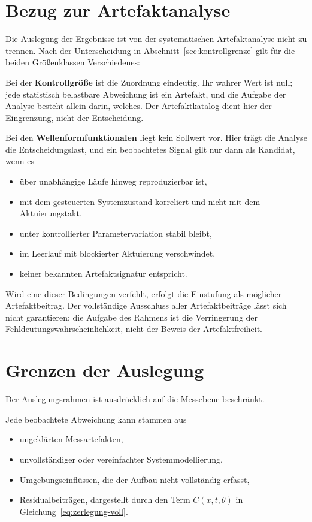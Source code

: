 \documentclass[12pt,a4paper]{report}
\begin{document}
\section{Bezug zur Artefaktanalyse}

Die Auslegung der Ergebnisse ist von der systematischen Artefaktanalyse
nicht zu trennen. Nach der Unterscheidung in
Abschnitt~\ref{sec:kontrollgrenze} gilt für die beiden Größenklassen
Verschiedenes:

Bei der \textbf{Kontrollgröße} ist die Zuordnung eindeutig. Ihr wahrer
Wert ist null; jede statistisch belastbare Abweichung ist ein Artefakt,
und die Aufgabe der Analyse besteht allein darin, welches. Der
Artefaktkatalog dient hier der Eingrenzung, nicht der Entscheidung.

Bei den \textbf{Wellenformfunktionalen} liegt kein Sollwert vor. Hier
trägt die Analyse die Entscheidungslast, und ein beobachtetes Signal
gilt nur dann als Kandidat, wenn es

\begin{itemize}
    \item über unabhängige Läufe hinweg reproduzierbar ist,
    \item mit dem gesteuerten Systemzustand korreliert und nicht mit dem
    Aktuierungstakt,
    \item unter kontrollierter Parametervariation stabil bleibt,
    \item im Leerlauf mit blockierter Aktuierung verschwindet,
    \item keiner bekannten Artefaktsignatur entspricht.
\end{itemize}

Wird eine dieser Bedingungen verfehlt, erfolgt die Einstufung als
möglicher Artefaktbeitrag. Der vollständige Ausschluss aller
Artefaktbeiträge lässt sich nicht garantieren; die Aufgabe des Rahmens
ist die Verringerung der Fehldeutungswahrscheinlichkeit, nicht der
Beweis der Artefaktfreiheit.

\section{Grenzen der Auslegung}

Der Auslegungsrahmen ist ausdrücklich auf die Messebene beschränkt.

Jede beobachtete Abweichung kann stammen aus

\begin{itemize}
    \item ungeklärten Messartefakten,
    \item unvollständiger oder vereinfachter Systemmodellierung,
    \item Umgebungseinflüssen, die der Aufbau nicht vollständig erfasst,
    \item Residualbeiträgen, dargestellt durch den Term $C(x,t,\theta)$
    in Gleichung~\eqref{eq:zerlegung-voll}.
\end{itemize}
\end{document}
